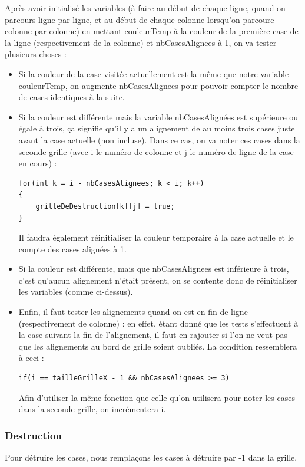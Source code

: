 Après avoir initialisé les variables (à faire au début de chaque ligne, quand on parcours ligne par ligne, et au début de chaque colonne lorsqu'on parcoure colonne par colonne)
en mettant couleurTemp à la couleur de la première case de la ligne (respectivement de la colonne) et nbCasesAlignees à 1,
on va tester plusieurs choses :
\begin{itemize}
\item
	Si la couleur de la case visitée actuellement est la même que notre variable couleurTemp, on augmente nbCasesAlignees pour pouvoir compter le nombre de cases identiques à la suite.
\item
	Si la couleur est différente mais la variable nbCasesAlignées est supérieure ou égale à trois, ça signifie qu'il y a un alignement de au moins trois cases juste avant la case actuelle (non incluse).
	Dans ce cas, on va noter ces cases dans la seconde grille (avec i le numéro de colonne et j le numéro de ligne de la case en cours) :
\begin{lstlisting}
for(int k = i - nbCasesAlignees; k < i; k++)
{
	grilleDeDestruction[k][j] = true;
}
\end{lstlisting}
Il faudra également réinitialiser la couleur temporaire à la case actuelle et le compte des cases alignées à 1.
\item
	Si la couleur est différente, mais que nbCasesAlignees est inférieure à trois, c'est qu'aucun alignement n'était présent, on se contente donc de réinitialiser les variables (comme ci-dessus).
\item
	Enfin, il faut tester les alignements quand on est en fin de ligne (respectivement de colonne) : en effet, étant donné que les tests s'effectuent à la case suivant la fin de l'alignement, il faut en rajouter si
	l'on ne veut pas que les alignements au bord de grille soient oubliés.
	La condition ressemblera à ceci :
\begin{lstlisting}
if(i == tailleGrilleX - 1 && nbCasesAlignees >= 3)
\end{lstlisting}
	Afin d'utiliser la même fonction que celle qu'on utilisera pour noter les cases dans la seconde grille, on incrémentera i.
\end{itemize}

\subsubsection{Destruction}

Pour détruire les cases, nous remplaçons les cases à détruire par -1 dans la grille.

